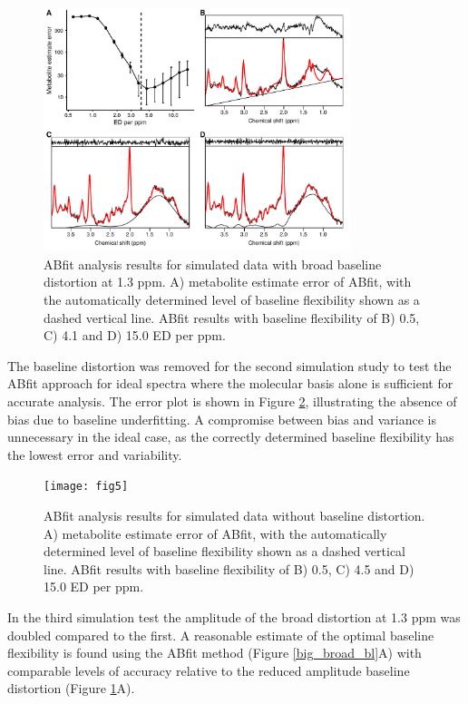 \documentclass[num-refs]{wiley-article}
\begin{document}
\begin{figure}
  \begin{center}
    \includegraphics[width=0.8\textwidth]{fig4}
    \caption{ABfit analysis results for simulated data with broad baseline distortion at 1.3 ppm. A) metabolite estimate error of ABfit, with the automatically determined level of baseline flexibility shown as a dashed vertical line. ABfit results with baseline flexibility of B) 0.5, C) 4.1 and D) 15.0 ED per ppm.}
    \label{broad_bl}
  \end{center}
\end{figure}

The baseline distortion was removed for the second simulation study to test the ABfit approach for ideal spectra where the molecular basis alone is sufficient for accurate analysis. The error plot is shown in Figure \ref{flat_bl}, illustrating the absence of bias due to baseline underfitting. A compromise between bias and variance is unnecessary in the ideal case, as the correctly determined baseline flexibility has the lowest error and variability.

\begin{figure}
  \begin{center}
    \texttt{[image: fig5]}
    \caption{ABfit analysis results for simulated data without baseline distortion. A) metabolite estimate error of ABfit, with the automatically determined level of baseline flexibility shown as a dashed vertical line. ABfit results with baseline flexibility of B) 0.5, C) 4.5 and D) 15.0 ED per ppm.}
    \label{flat_bl}
  \end{center}
\end{figure}

In the third simulation test the amplitude of the broad distortion at 1.3 ppm was doubled compared to the first. A reasonable estimate of the optimal baseline flexibility is found using the ABfit method (Figure \ref{big_broad_bl}A) with comparable levels of accuracy relative to the reduced amplitude baseline distortion (Figure \ref{broad_bl}A).
\end{document}
